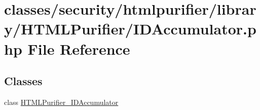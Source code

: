\hypertarget{IDAccumulator_8php}{\section{classes/security/htmlpurifier/library/\+H\+T\+M\+L\+Purifier/\+I\+D\+Accumulator.php File Reference}
\label{IDAccumulator_8php}
}
\subsection*{Classes}
\begin{DoxyCompactItemize}
\item 
class \hyperlink{classHTMLPurifier__IDAccumulator}{H\+T\+M\+L\+Purifier\+\_\+\+I\+D\+Accumulator}
\end{DoxyCompactItemize}
